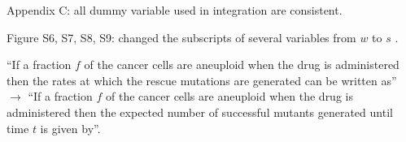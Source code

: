\documentclass[12pt]{extarticle}
\begin{document}
Appendix C: all dummy variable used in integration are consistent. %

Figure S6, S7, S8, S9: changed the subscripts of several variables from $w$ to $s$ . %

``If a fraction $f$ of the cancer cells are aneuploid when the drug is administered then the rates at which the rescue mutations are generated can be written as'' $\rightarrow$
``If a fraction $f$ of the cancer cells are aneuploid when the drug is administered then the expected number of successful mutants generated until time $t$ is given by''. %




\end{document}

